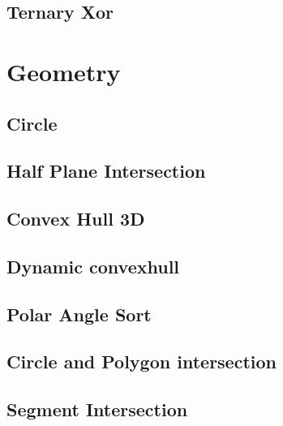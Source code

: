 \documentclass[a4paper,10pt,twocolumn,oneside]{article}
\begin{document}
\subsection{Ternary Xor}



\section{Geometry}
\subsection{Circle}


\subsection{Half Plane Intersection}


%

\subsection{Convex Hull 3D}


\subsection{Dynamic convexhull}


\subsection{Polar Angle Sort}


\subsection{Circle and Polygon intersection}


\subsection{Segment Intersection}

\end{document}
